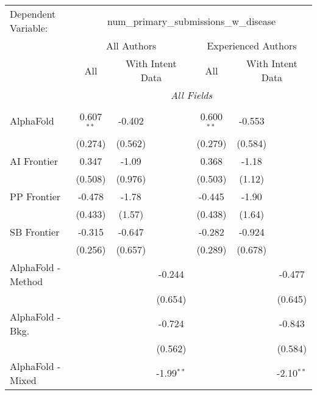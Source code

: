 \begingroup
\centering
\begin{tabular}{lcccccc}
   \tabularnewline \midrule \midrule
   Dependent Variable: & \multicolumn{6}{c}{num\_primary\_submissions\_w\_disease}\\
 & \multicolumn{3}{c}{All Authors} & \multicolumn{3}{c}{Experienced Authors} \\
\cmidrule(lr){2-4} \cmidrule(lr){5-7}
 & \multicolumn{1}{c}{All} & \multicolumn{2}{c}{With Intent Data} & \multicolumn{1}{c}{All} & \multicolumn{2}{c}{With Intent Data} \\
\cmidrule(lr){2-2} \cmidrule(lr){3-4} \cmidrule(lr){5-5} \cmidrule(lr){6-7}
 & \multicolumn{6}{c}{\textit{All Fields}} \\ \\
   AlphaFold            & 0.607$^{**}$ & -0.402  &               & 0.600$^{**}$ & -0.553  &   \\   
                        & (0.274)      & (0.562) &               & (0.279)      & (0.584) &   \\   
   AI Frontier          & 0.347        & -1.09   &               & 0.368        & -1.18   &   \\   
                        & (0.508)      & (0.976) &               & (0.503)      & (1.12)  &   \\   
   PP Frontier          & -0.478       & -1.78   &               & -0.445       & -1.90   &   \\   
                        & (0.433)      & (1.57)  &               & (0.438)      & (1.64)  &   \\   
   SB Frontier          & -0.315       & -0.647  &               & -0.282       & -0.924  &   \\   
                        & (0.256)      & (0.657) &               & (0.289)      & (0.678) &   \\   
   AlphaFold - Method   &              &         & -0.244        &              &         & -0.477\\   
                        &              &         & (0.654)       &              &         & (0.645)\\   
   AlphaFold - Bkg.     &              &         & -0.724        &              &         & -0.843\\   
                        &              &         & (0.562)       &              &         & (0.584)\\   
   AlphaFold - Mixed    &              &         & -1.99$^{**}$  &              &         & -2.10$^{**}$\\   

\end{tabular}
